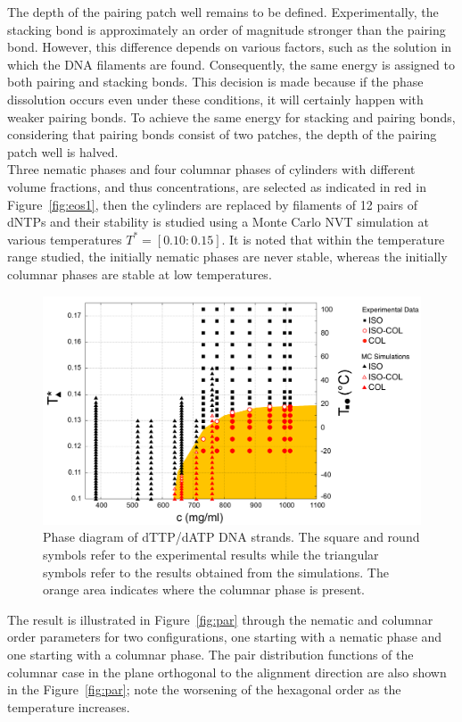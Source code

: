 \documentclass[aip,jcp, amsmath, amssymb, reprint]{revtex4-1}
\begin{document}
The depth of the pairing patch well remains to be defined. Experimentally, the stacking bond is approximately an order
of magnitude stronger than the pairing bond. However, this difference depends on various factors, such as the solution
in which the DNA filaments are found. Consequently, the same energy is assigned to both pairing and stacking bonds. This
decision is made because if the phase dissolution occurs even under these conditions, it will certainly happen with
weaker pairing bonds. To achieve the same energy for stacking and pairing bonds, considering that pairing bonds consist
of two patches, the depth of the pairing patch well is halved.\\
Three nematic phases and four columnar phases of cylinders with different volume fractions, and thus concentrations, are
selected as indicated in red in Figure~\ref{fig:eos1}, then the cylinders are replaced by filaments of 12 pairs of dNTPs
and their stability is studied using a Monte Carlo NVT simulation at various temperatures $T^*=[0.10:0.15]$. It is noted
that within the temperature range studied, the initially nematic phases are never stable, whereas the initially columnar
phases are stable at low temperatures. 
\begin{figure}[t!] \includegraphics[width=0.7\linewidth]{finaleeng.png} \caption{\label{fig:wide}Phase diagram of
    dTTP/dATP DNA strands. The square and round symbols refer to the experimental results while the triangular symbols
  refer to the results obtained from the simulations. The orange area indicates where the columnar phase is present.}
\end{figure}

 The result is illustrated in Figure~\ref{fig:par} through the nematic and columnar order parameters for two
 configurations, one starting with a nematic phase and one starting with a columnar phase. The pair distribution
 functions of the columnar case in the plane orthogonal to the alignment direction are also shown in the Figure~\ref{fig:par}; note the worsening of the hexagonal order as the temperature increases.
\end{document}

